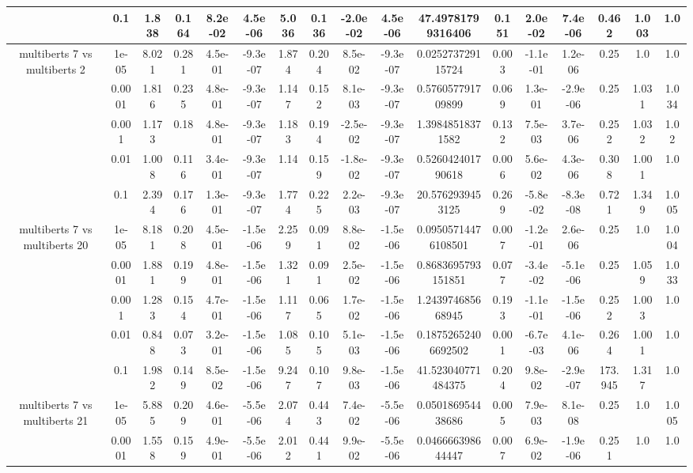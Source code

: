 \begin{tabular}{|c|c|c|c|c|c|c|c|c|c|c|c|c|c|c|c|c|}
 & 0.1 & 1.838 & 0.164 & 8.2e-02 & 4.5e-06 & 5.036 & 0.136 & -2.0e-02 & 4.5e-06 & 47.49781799316406 & 0.151 & 2.0e-02 & 7.4e-06 & 0.462 & 1.003 & 1.0 \\
\hline
\multirow{5}{*}{multiberts 7 vs multiberts 2} & 1e-05 & 8.021 & 0.281 & 4.5e-01 & -9.3e-07 & 1.874 & 0.204 & 8.5e-02 & -9.3e-07 & 0.025273729115724 & 0.003 & -1.1e-01 & 1.2e-06 & 0.25 & 1.0 & 1.0 \\
 & 0.0001 & 1.816 & 0.235 & 4.8e-01 & -9.3e-07 & 1.147 & 0.152 & 8.1e-03 & -9.3e-07 & 0.576057791709899 & 0.069 & 1.3e-01 & -2.9e-06 & 0.25 & 1.031 & 1.034 \\
 & 0.001 & 1.173 & 0.18 & 4.8e-01 & -9.3e-07 & 1.183 & 0.194 & -2.5e-02 & -9.3e-07 & 1.39848518371582 & 0.132 & 7.5e-03 & 3.7e-06 & 0.252 & 1.032 & 1.02 \\
 & 0.01 & 1.008 & 0.116 & 3.4e-01 & -9.3e-07 & 1.14 & 0.159 & -1.8e-02 & -9.3e-07 & 0.526042401790618 & 0.006 & 5.6e-02 & 4.3e-06 & 0.308 & 1.001 & 1.0 \\
 & 0.1 & 2.394 & 0.176 & 1.3e-01 & -9.3e-07 & 1.774 & 0.225 & 2.2e-03 & -9.3e-07 & 20.5762939453125 & 0.269 & -5.8e-02 & -8.3e-08 & 0.721 & 1.349 & 1.005 \\
\hline
\multirow{5}{*}{multiberts 7 vs multiberts 20} & 1e-05 & 8.181 & 0.208 & 4.5e-01 & -1.5e-06 & 2.259 & 0.091 & 8.8e-02 & -1.5e-06 & 0.09505714476108501 & 0.007 & -1.2e-01 & 2.6e-06 & 0.25 & 1.0 & 1.004 \\
 & 0.0001 & 1.881 & 0.199 & 4.8e-01 & -1.5e-06 & 1.321 & 0.091 & 2.5e-02 & -1.5e-06 & 0.8683695793151851 & 0.077 & -3.4e-02 & -5.1e-06 & 0.25 & 1.059 & 1.033 \\
 & 0.001 & 1.283 & 0.154 & 4.7e-01 & -1.5e-06 & 1.117 & 0.065 & 1.7e-02 & -1.5e-06 & 1.243974685668945 & 0.193 & -1.1e-01 & -1.5e-06 & 0.252 & 1.003 & 1.0 \\
 & 0.01 & 0.848 & 0.073 & 3.2e-01 & -1.5e-06 & 1.085 & 0.105 & 5.1e-03 & -1.5e-06 & 0.18752652406692502 & 0.001 & -6.7e-03 & 4.1e-06 & 0.264 & 1.001 & 1.0 \\
 & 0.1 & 1.982 & 0.149 & 8.5e-02 & -1.5e-06 & 9.247 & 0.107 & 9.8e-03 & -1.5e-06 & 41.523040771484375 & 0.204 & 9.8e-02 & -2.9e-07 & 173.945 & 1.317 & 1.0 \\
\hline
\multirow{5}{*}{multiberts 7 vs multiberts 21} & 1e-05 & 5.885 & 0.209 & 4.6e-01 & -5.5e-06 & 2.074 & 0.443 & 7.4e-02 & -5.5e-06 & 0.050186954438686 & 0.005 & 7.9e-03 & 8.1e-08 & 0.25 & 1.0 & 1.005 \\
 & 0.0001 & 1.558 & 0.159 & 4.9e-01 & -5.5e-06 & 2.012 & 0.441 & 9.9e-02 & -5.5e-06 & 0.046666398644447 & 0.007 & 6.9e-02 & -1.9e-06 & 0.251 & 1.0 & 1.0 \\

\end{tabular}
